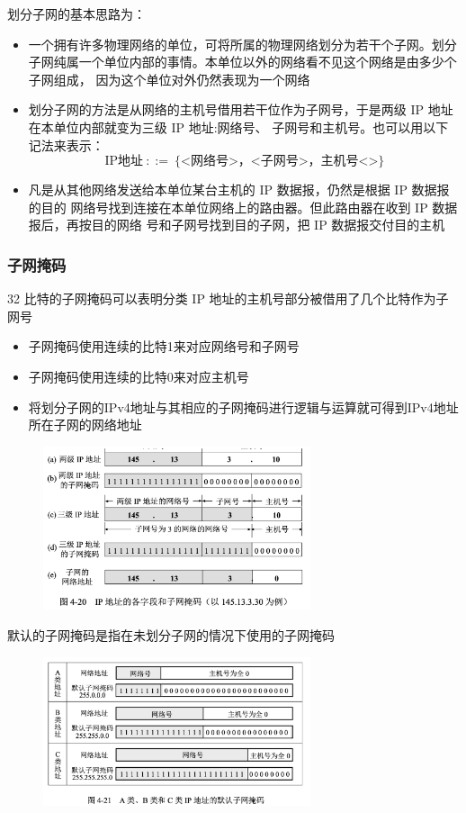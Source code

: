 \documentclass[cs4size,a4paper,10pt]{ctexart}
\begin{document}
	划分子网的基本思路为：
	\begin{itemize}
		\item 一个拥有许多物理网络的单位，可将所属的物理网络划分为若干个子网。划分子网纯属一个单位内部的事情。本单位以外的网络看不见这个网络是由多少个子网组成， 因为这个单位对外仍然表现为一个网络
		\item 划分子网的方法是从网络的主机号借用若干位作为子网号，于是两级 IP 地址在本单位内部就变为三级 IP 地址:网络号、 子网号和主机号。也可以用以下记法来表示：$${\mathrm{IP}} \mbox{地址}\ ::=\ \{\mbox{<网络号>，<子网号>，主机号<>}\}$$
		\item 凡是从其他网络发送给本单位某台主机的 IP 数据报，仍然是根据 IP 数据报的目的 网络号找到连接在本单位网络上的路由器。但此路由器在收到 IP 数据报后，再按目的网络 号和子网号找到目的子网，把 IP 数据报交付目的主机
	\end{itemize}

	\subsubsection{子网掩码}
	32 比特的子网掩码可以表明分类 IP 地址的主机号部分被借用了几个比特作为子网号
	\begin{itemize}
		\item 子网掩码使用连续的比特1来对应网络号和子网号
		\item 子网掩码使用连续的比特0来对应主机号
		\item 将划分子网的IPv4地址与其相应的子网掩码进行逻辑与运算就可得到IPv4地址所在子网的网络地址
	\end{itemize}
	\begin{figure}[H]
		\centering
		\includegraphics[width=0.7\textwidth]{img/4.20}
	\end{figure}

	默认的子网掩码是指在未划分子网的情况下使用的子网掩码
	\begin{figure}[H]
		\centering
		\includegraphics[width=0.7\textwidth]{img/4.21}
	\end{figure}
\end{document}
